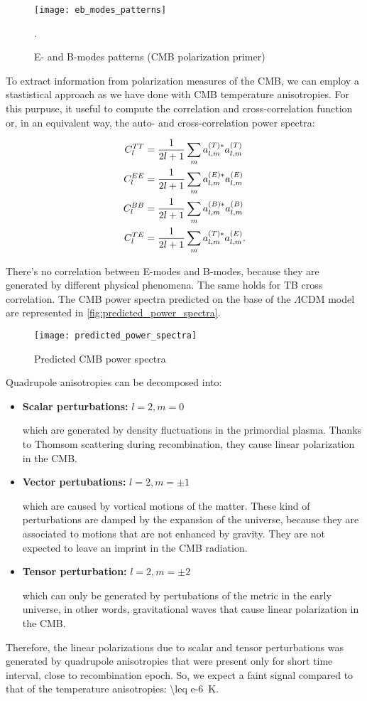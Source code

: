 \begin{figure}
        \centering
        \texttt{[image: eb\_modes\_patterns]}
        \caption{E- and B-modes patterns (CMB polarization primer)}
        \label{fig:eb_modes_patterns}.
\end{figure}

To extract information from polarization measures of the CMB, we can employ
a stastistical approach as we have done with CMB temperature anisotropies.
For this purpuse, it useful to compute the correlation and cross-correlation
function or, in an equivalent way, the auto- and cross-correlation power
spectra:

\begin{align}
        C^{TT}_l & = \frac{1}{2l + 1}\sum_m
        a^{\qty(T)*}_{l,m} a^{\qty(T)}_{l,m} \\
        C^{EE}_l & = \frac{1}{2l + 1}\sum_m
        a^{\qty(E)*}_{l,m} a^{\qty(E)}_{l,m} \\
        C^{BB}_l & = \frac{1}{2l + 1}\sum_m
        a^{\qty(B)*}_{l,m} a^{\qty(B)}_{l,m} \\
        C^{TE}_l & = \frac{1}{2l + 1}\sum_m
        a^{\qty(T)*}_{l,m} a^{\qty(E)}_{l,m}.
\end{align}

There's no correlation between E-modes and B-modes, because they are
generated by different physical phenomena. The same holds for TB cross
correlation. The CMB power spectra predicted on the base of the
$\Lambda$CDM model are represented in
\autoref{fig:predicted_power_spectra}.

\begin{figure}
        \centering
        \texttt{[image: predicted\_power\_spectra]}
        \caption{Predicted CMB power spectra}
        \label{fig:predicted_power_spectra}
\end{figure}

Quadrupole anisotropies can be decomposed into:

\begin{itemize}
        \item \textbf{Scalar perturbations:} $l = 2, m = 0$

        which are generated by density fluctuations in the primordial
        plasma. Thanks to Thomsom scattering during recombination, they
        cause linear polarization in the CMB.

        \item \textbf{Vector pertubations:} $l = 2, m = \pm 1$

        which are caused by vortical motions of the matter. These kind of
        perturbations are damped by the expansion of the universe, because
        they are associated to motions that are not enhanced by gravity.
        They are not expected to leave an imprint in the CMB radiation.

        \item \textbf{Tensor perturbation:} $l = 2, m = \pm 2$

        which can only be generated by pertubations of the metric in the
        early universe, in other words, gravitational waves that cause
        linear polarization in the CMB.
\end{itemize}

Therefore, the linear polarizations due to scalar and tensor perturbations was
generated by quadrupole anisotropies that were present only for short time
interval, close to recombination epoch. So, we expect a faint signal compared to
that of the temperature anisotropies: \SI{\leq e-6}{\kelvin}.
